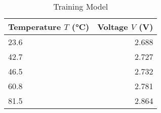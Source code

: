 \begin{table}[h]
  \centering
  \caption{Training Model}
  \label{tab:pt100}
  \begin{tabular}{lr}
    \toprule
    \textbf{Temperature $T$ (°C)} & \textbf{Voltage $V$ (V)} \\
    \midrule
    23.6 & 2.688 \\
    42.7 & 2.727 \\
    46.5 & 2.732 \\
    60.8 & 2.781 \\
    81.5 & 2.864 \\
    \bottomrule
  \end{tabular}
\end{table}
